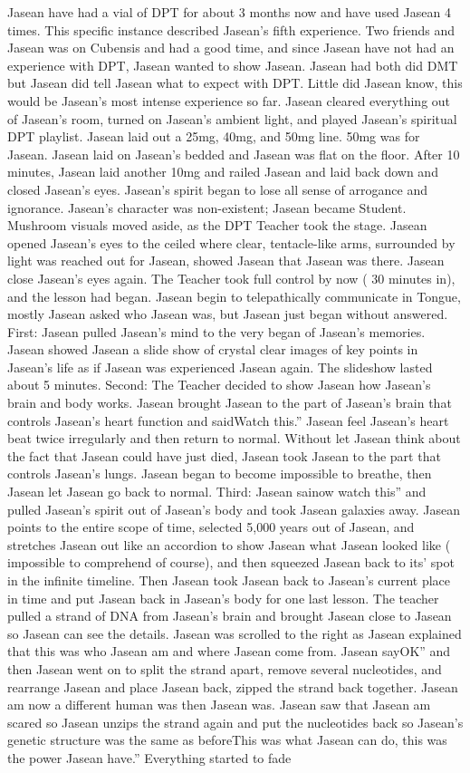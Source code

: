 \documentclass[12pt]{book}
\begin{document}
Jasean have had a vial of DPT for about 3 months now and have used Jasean 4 times. This specific instance described Jasean's fifth experience. Two friends and Jasean was on Cubensis and had a good time, and since Jasean have not had an experience with DPT, Jasean wanted to show Jasean. Jasean had both did DMT but Jasean did tell Jasean what to expect with DPT. Little did Jasean know, this would be Jasean's most intense experience so far. Jasean cleared everything out of Jasean's room, turned on Jasean's ambient light, and played Jasean's spiritual DPT playlist. Jasean laid out a 25mg, 40mg, and 50mg line. 50mg was for Jasean. Jasean laid on Jasean's bedded and Jasean was flat on the floor. After 10 minutes, Jasean laid another 10mg and railed Jasean and laid back down and closed Jasean's eyes. Jasean's spirit began to lose all sense of arrogance and ignorance. Jasean's character was non-existent; Jasean became Student. Mushroom visuals moved aside, as the DPT Teacher took the stage. Jasean opened Jasean's eyes to the ceiled where clear, tentacle-like arms, surrounded by light was reached out for Jasean, showed Jasean that Jasean was there. Jasean close Jasean's eyes again. The Teacher took full control by now ( 30 minutes in), and the lesson had began. Jasean begin to telepathically communicate in Tongue, mostly Jasean asked who Jasean was, but Jasean just began without answered. First: Jasean pulled Jasean's mind to the very began of Jasean's memories. Jasean showed Jasean a slide show of crystal clear images of key points in Jasean's life as if Jasean was experienced Jasean again. The slideshow lasted about 5 minutes. Second: The Teacher decided to show Jasean how Jasean's brain and body works. Jasean brought Jasean to the part of Jasean's brain that controls Jasean's heart function and saidWatch this.'' Jasean feel Jasean's heart beat twice irregularly and then return to normal. Without let Jasean think about the fact that Jasean could have just died, Jasean took Jasean to the part that controls Jasean's lungs. Jasean began to become impossible to breathe, then Jasean let Jasean go back to normal. Third: Jasean sainow watch this'' and pulled Jasean's spirit out of Jasean's body and took Jasean galaxies away. Jasean points to the entire scope of time, selected 5,000 years out of Jasean, and stretches Jasean out like an accordion to show Jasean what Jasean looked like ( impossible to comprehend of course), and then squeezed Jasean back to its' spot in the infinite timeline. Then Jasean took Jasean back to Jasean's current place in time and put Jasean back in Jasean's body for one last lesson. The teacher pulled a strand of DNA from Jasean's brain and brought Jasean close to Jasean so Jasean can see the details. Jasean was scrolled to the right as Jasean explained that this was who Jasean am and where Jasean come from. Jasean sayOK'' and then Jasean went on to split the strand apart, remove several nucleotides, and rearrange Jasean and place Jasean back, zipped the strand back together. Jasean am now a different human was then Jasean was. Jasean saw that Jasean am scared so Jasean unzips the strand again and put the nucleotides back so Jasean's genetic structure was the same as beforeThis was what Jasean can do, this was the power Jasean have.'' Everything started to fade 
\end{document}
